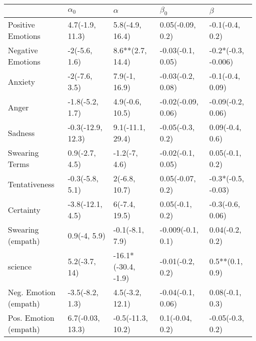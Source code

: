 \begin{tabular}{lllll}
\toprule
{} &         $\alpha_0$ &             $\alpha$ &           $\beta_0$ &              $\beta$ \\
\midrule
Positive Emotions     &    4.7(-1.9, 11.3) &      5.8(-4.9, 16.4) &    0.05(-0.09, 0.2) &      -0.1(-0.4, 0.2) \\
Negative Emotions     &      -2(-5.6, 1.6) &     8.6**(2.7, 14.4) &   -0.03(-0.1, 0.05) &  -0.2*(-0.3, -0.006) \\
Anxiety               &      -2(-7.6, 3.5) &        7.9(-1, 16.9) &   -0.03(-0.2, 0.08) &     -0.1(-0.4, 0.09) \\
Anger                 &    -1.8(-5.2, 1.7) &      4.9(-0.6, 10.5) &  -0.02(-0.09, 0.06) &    -0.09(-0.2, 0.06) \\
Sadness               &  -0.3(-12.9, 12.3) &     9.1(-11.1, 29.4) &    -0.05(-0.3, 0.2) &      0.09(-0.4, 0.6) \\
Swearing Terms        &     0.9(-2.7, 4.5) &        -1.2(-7, 4.6) &   -0.02(-0.1, 0.05) &      0.05(-0.1, 0.2) \\
Tentativeness         &    -0.3(-5.8, 5.1) &        2(-6.8, 10.7) &    0.05(-0.07, 0.2) &   -0.3*(-0.5, -0.03) \\
Certainty             &   -3.8(-12.1, 4.5) &        6(-7.4, 19.5) &     0.05(-0.1, 0.2) &     -0.3(-0.6, 0.06) \\
Swearing (empath)     &       0.9(-4, 5.9) &      -0.1(-8.1, 7.9) &   -0.009(-0.1, 0.1) &      0.04(-0.2, 0.2) \\
science               &      5.2(-3.7, 14) &  -16.1*(-30.4, -1.9) &    -0.01(-0.2, 0.2) &      0.5**(0.1, 0.9) \\
Neg. Emotion (empath) &    -3.5(-8.2, 1.3) &      4.5(-3.2, 12.1) &   -0.04(-0.1, 0.06) &      0.08(-0.1, 0.3) \\
Pos. Emotion (empath) &   6.7(-0.03, 13.3) &    -0.5(-11.3, 10.2) &     0.1(-0.04, 0.2) &     -0.05(-0.3, 0.2) \\
\bottomrule
\end{tabular}
